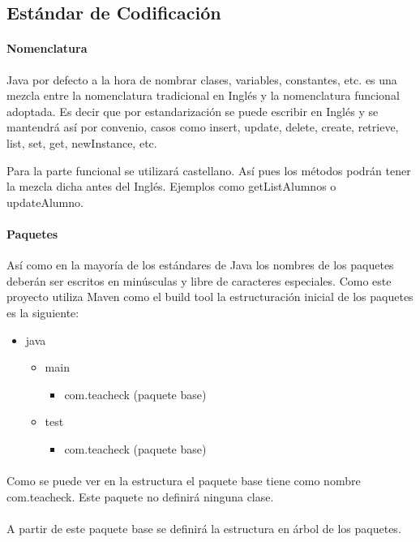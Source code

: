 \subsection{Estándar de Codificación}
\paragraph{Nomenclatura}
Java por defecto a la hora de nombrar clases, variables, constantes,
etc. es una mezcla entre la nomenclatura tradicional en Inglés y la
nomenclatura funcional adoptada. Es decir que por estandarización se
puede escribir en Inglés y se mantendrá así por convenio, casos como
insert, update, delete, create, retrieve, list, set, get, newInstance,
etc.

Para la parte funcional se utilizará castellano. Así pues los métodos
podrán tener la mezcla dicha antes del Inglés. Ejemplos como
getListAlumnos o updateAlumno.
\paragraph{Paquetes}
Así como en la mayoría de los estándares de Java los nombres de los
paquetes deberán ser escritos en minúsculas y libre de caracteres
especiales. Como este proyecto utiliza Maven como el build tool la
estructuración inicial de los paquetes es la siguiente:

\begin{itemize}
\item
  java
  \begin{itemize}
  \item
    main
    \begin{itemize}
    \item
      com.teacheck (paquete base)
    \end{itemize}
  \item
   test
   \begin{itemize}
   \item
     com.teacheck (paquete base)
   \end{itemize}
  \end{itemize}
\end{itemize}

\paragraph{}
Como se puede ver en la estructura el paquete base tiene como nombre
com.teacheck. Este paquete no definirá ninguna clase.

\paragraph{}
A partir de este paquete base se definirá la estructura en árbol de
los paquetes.

